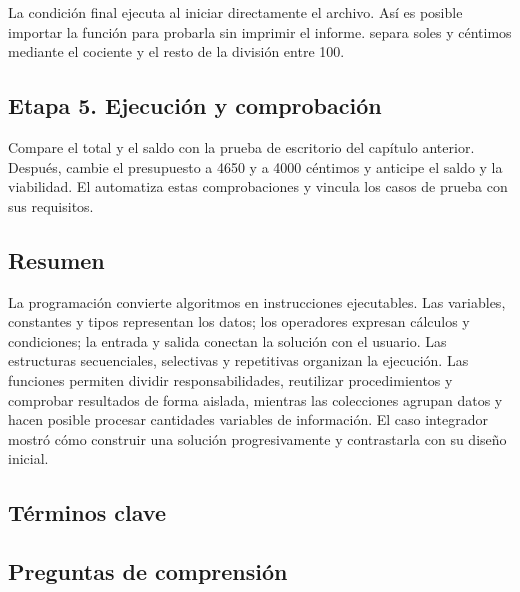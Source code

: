 
La condición final ejecuta  al iniciar directamente el archivo. Así es posible importar la función para probarla sin imprimir el informe.  separa soles y céntimos mediante el cociente y el resto de la división entre 100.

\subsection{Etapa 5. Ejecución y comprobación}




Compare el total y el saldo con la prueba de escritorio del capítulo anterior. Después, cambie el presupuesto a 4650 y a 4000 céntimos y anticipe el saldo y la viabilidad. El  automatiza estas comprobaciones y vincula los casos de prueba con sus requisitos.


\subsection{Resumen}

La programación convierte algoritmos en instrucciones ejecutables. Las variables, constantes y tipos representan los datos; los operadores expresan cálculos y condiciones; la entrada y salida conectan la solución con el usuario. Las estructuras secuenciales, selectivas y repetitivas organizan la ejecución. Las funciones permiten dividir responsabilidades, reutilizar procedimientos y comprobar resultados de forma aislada, mientras las colecciones agrupan datos y hacen posible procesar cantidades variables de información. El caso integrador mostró cómo construir una solución progresivamente y contrastarla con su diseño inicial.

\subsection{Términos clave}



\subsection{Preguntas de comprensión}

